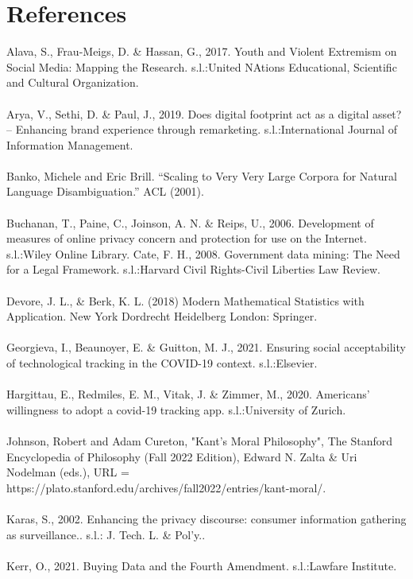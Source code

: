\documentclass[11pt]{article}
\begin{document}
\section{References}
Alava, S., Frau-Meigs, D. \& Hassan, G., 2017. Youth and Violent Extremism on Social Media: Mapping the Research. s.l.:United NAtions Educational, Scientific and Cultural Organization.
\\ \\
Arya, V., Sethi, D. \& Paul, J., 2019. Does digital footprint act as a digital asset? – Enhancing brand experience through remarketing. s.l.:International Journal of Information Management.
\\ \\
Banko, Michele and Eric Brill. “Scaling to Very Very Large Corpora for Natural Language Disambiguation.” ACL (2001).
\\ \\
Buchanan, T., Paine, C., Joinson, A. N. \& Reips, U., 2006. Development of measures of online privacy concern and protection for use on the Internet. s.l.:Wiley Online Library.
Cate, F. H., 2008. Government data mining: The Need for a Legal Framework. s.l.:Harvard Civil Rights-Civil Liberties Law Review.
\\ \\
Devore, J. L., \& Berk, K. L. (2018) Modern Mathematical Statistics with Application. New York Dordrecht Heidelberg London: Springer.
\\ \\
Georgieva, I., Beaunoyer, E. \& Guitton, M. J., 2021. Ensuring social acceptability of technological tracking in the COVID-19 context. s.l.:Elsevier.
\\ \\
Hargittau, E., Redmiles, E. M., Vitak, J. \& Zimmer, M., 2020. Americans' willingness to adopt a covid-19 tracking app. s.l.:University of Zurich.
\\ \\
Johnson, Robert and Adam Cureton, "Kant’s Moral Philosophy", The Stanford Encyclopedia of Philosophy (Fall 2022 Edition), Edward N. Zalta \& Uri Nodelman (eds.), URL = https://plato.stanford.edu/archives/fall2022/entries/kant-moral/. 
\\ \\
Karas, S., 2002. Enhancing the privacy discourse: consumer information gathering as surveillance.. s.l.: J. Tech. L. \& Pol'y..
\\ \\
Kerr, O., 2021. Buying Data and the Fourth Amendment. s.l.:Lawfare Institute.
\end{document}
